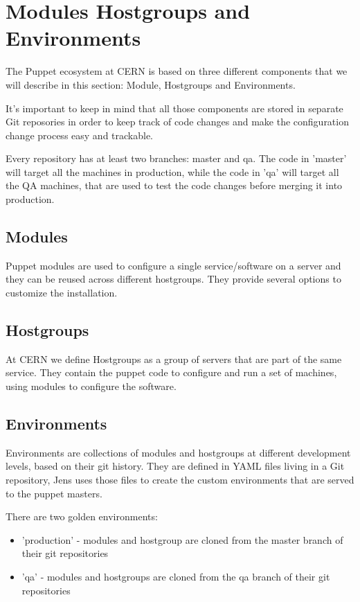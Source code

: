 \section{Modules Hostgroups and Environments}

The Puppet ecosystem at CERN is based on three different components that
we will describe in this section: Module, Hostgroups and Environments.

It's important to keep in mind that all those components are stored in
separate Git reposories in order to keep track of code changes and make
the configuration change process easy and trackable.

Every repository has at least two branches: master and qa. The code in
'master' will target all the machines in production, while the code in
'qa' will target all the QA machines, that are used to test the code
changes before merging it into production.

\subsection{Modules}

Puppet modules are used to configure a single service/software on a server
and they can be reused across different hostgroups. They provide several
options to customize the installation.

\subsection{Hostgroups}

At CERN we define Hostgroups as a group of servers that are part of the
same service. They contain the puppet code to configure and run a set of
machines, using modules to configure the software.


\subsection{Environments}

Environments are collections of modules and hostgroups at different
development levels, based on their git history. They are defined in YAML
files living in a Git repository, Jens uses those files to create the
custom environments that are served to the puppet masters.

There are two golden environments:

\begin{itemize}
    \item 'production' - modules and hostgroup are cloned from the master branch of
their git repositories
    \item 'qa' - modules and hostgroups are cloned from the qa branch of their git
repositories
\end{itemize}

